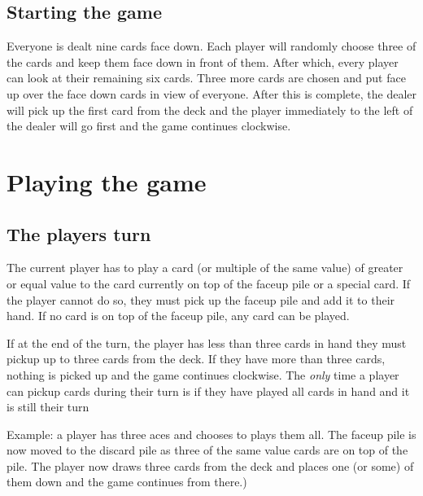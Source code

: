 \documentclass{article}
\begin{document}
\subsection*{Starting the game}
Everyone is dealt nine cards face down. Each player will randomly choose three of the cards and keep them face down in front of them. After which, every player can look at their remaining six cards. Three more cards are chosen and put face up over the face down cards in view of everyone. After this is complete, the dealer will pick up the first card from the deck and the player immediately to the left of the dealer will go first and the game continues clockwise.

\section*{Playing the game}
\subsection*{The players turn}
The current player has to play a card (or multiple of the same value) of greater or equal value to the card currently on top of the faceup pile or a special card. If the player cannot do so, they must pick up the faceup pile and add it to their hand. If no card is on top of the faceup pile, any card can be played.

If at the end of the turn, the player has less than three cards in hand they must pickup up to three cards from the deck. If they have more than three cards, nothing is picked up and the game continues clockwise. The \textit{only} time a player can pickup cards during their turn is if they have played all cards in hand and it is still their turn

Example: a player has three aces and chooses to plays them all. The faceup pile is now moved to the discard pile as three of the same value cards are on top of the pile. The player now draws three cards from the deck and places one (or some) of them down and the game continues from there.)
\end{document}
